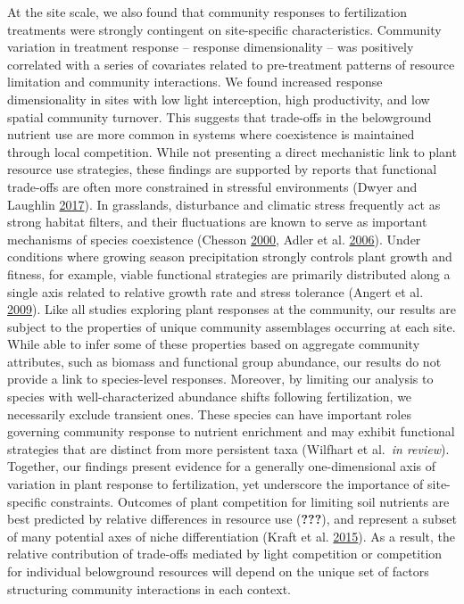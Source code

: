 \documentclass[twoside,12pt,final]{ucthesis-CA2012}
\begin{document}
\begin{ucmainmatter}
At the site scale, we also found that community responses to fertilization treatments were strongly contingent on site-specific characteristics. Community variation in treatment response -- response dimensionality -- was positively correlated with a series of covariates related to pre-treatment patterns of resource limitation and community interactions. We found increased response dimensionality in sites with low light interception, high productivity, and low spatial community turnover. This suggests that trade-offs in the belowground nutrient use are more common in systems where coexistence is maintained through local competition. While not presenting a direct mechanistic link to plant resource use strategies, these findings are supported by reports that functional trade-offs are often more constrained in stressful environments (Dwyer and Laughlin \protect\hyperlink{ref-Dwyer2017}{2017}). In grasslands, disturbance and climatic stress frequently act as strong habitat filters, and their fluctuations are known to serve as important mechanisms of species coexistence (Chesson \protect\hyperlink{ref-Chesson2000}{2000}, Adler et al. \protect\hyperlink{ref-Adler2006}{2006}). Under conditions where growing season precipitation strongly controls plant growth and fitness, for example, viable functional strategies are primarily distributed along a single axis related to relative growth rate and stress tolerance (Angert et al. \protect\hyperlink{ref-Angert2009}{2009}).
Like all studies exploring plant responses at the community, our results are subject to the properties of unique community assemblages occurring at each site. While able to infer some of these properties based on aggregate community attributes, such as biomass and functional group abundance, our results do not provide a link to species-level responses. Moreover, by limiting our analysis to species with well-characterized abundance shifts following fertilization, we necessarily exclude transient ones. These species can have important roles governing community response to nutrient enrichment and may exhibit functional strategies that are distinct from more persistent taxa (Wilfhart et al.~\emph{in review}).
Together, our findings present evidence for a generally one-dimensional axis of variation in plant response to fertilization, yet underscore the importance of site-specific constraints. Outcomes of plant competition for limiting soil nutrients are best predicted by relative differences in resource use ({\textbf{???}}), and represent a subset of many potential axes of niche differentiation (Kraft et al. \protect\hyperlink{ref-Kraft2015}{2015}). As a result, the relative contribution of trade-offs mediated by light competition or competition for individual belowground resources will depend on the unique set of factors structuring community interactions in each context.

\end{ucmainmatter}
\end{document}
